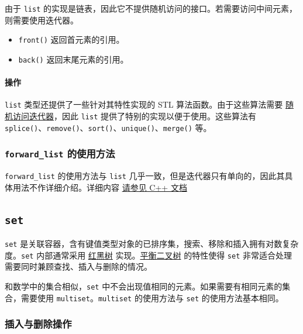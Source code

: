 由于 \texttt{list} 的实现是链表，因此它不提供随机访问的接口。若需要访问中间元素，则需要使用迭代器。

\begin{itemize}
\tightlist
\item
  \texttt{front()} 返回首元素的引用。
\item
  \texttt{back()} 返回末尾元素的引用。
\end{itemize}

\paragraph{操作}\label{ux64cdux4f5c-1}

\texttt{list} 类型还提供了一些针对其特性实现的 STL 算法函数。由于这些算法需要 \href{./iterator.md}{随机访问迭代器}，因此 \texttt{list} 提供了特别的实现以便于使用。这些算法有 \texttt{splice()}、\texttt{remove()}、\texttt{sort()}、\texttt{unique()}、\texttt{merge()} 等。

\subsubsection{\texorpdfstring{\texttt{forward\_list} 的使用方法}{forward\_list 的使用方法}}\label{forward_list-ux7684ux4f7fux7528ux65b9ux6cd5}

\texttt{forward\_list} 的使用方法与 \texttt{list} 几乎一致，但是迭代器只有单向的，因此其具体用法不作详细介绍。详细内容 \href{https://zh.cppreference.com/w/cpp/container/forward_list}{请参见 C++ 文档}

\subsection{\texorpdfstring{\texttt{set}}{set}}\label{set}

\texttt{set} 是关联容器，含有键值类型对象的已排序集，搜索、移除和插入拥有对数复杂度。\texttt{set} 内部通常采用 \href{../../ds/rbtree.md}{红黑树} 实现。\href{../../ds/bst.md}{平衡二叉树} 的特性使得 \texttt{set} 非常适合处理需要同时兼顾查找、插入与删除的情况。

和数学中的集合相似，\texttt{set} 中不会出现值相同的元素。如果需要有相同元素的集合，需要使用 \texttt{multiset}。\texttt{multiset} 的使用方法与 \texttt{set} 的使用方法基本相同。

\subsubsection{插入与删除操作}\label{ux63d2ux5165ux4e0eux5220ux9664ux64cdux4f5c}

